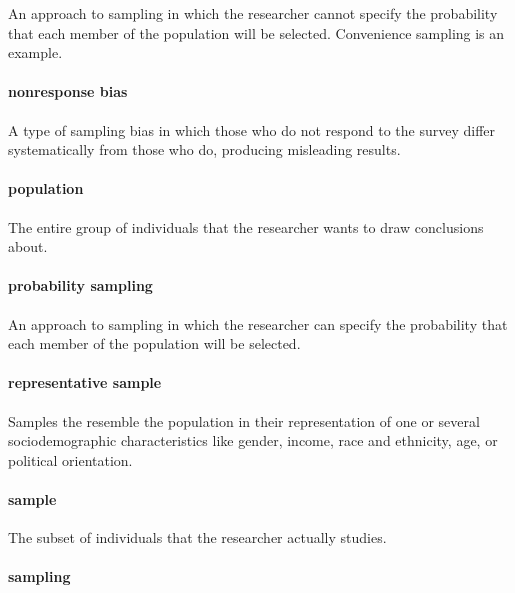 \documentclass[
]{krantz}
\begin{document}
An approach to sampling in which the researcher cannot specify the probability that each member of the population will be selected. Convenience sampling is an example.

\paragraph*{nonresponse bias}\label{nonresponse-bias-1}

A type of sampling bias in which those who do not respond to the survey differ systematically from those who do, producing misleading results.

\paragraph*{population}\label{population-1}

The entire group of individuals that the researcher wants to draw conclusions about.

\paragraph*{probability sampling}\label{probability-sampling}

An approach to sampling in which the researcher can specify the probability that each member of the population will be selected.

\paragraph*{representative sample}\label{representative-sample}

Samples the resemble the population in their representation of one or several sociodemographic characteristics like gender, income, race and ethnicity, age, or political orientation.

\paragraph*{sample}\label{sample-1}

The subset of individuals that the researcher actually studies.

\paragraph*{sampling}\label{sampling-1}
\end{document}
